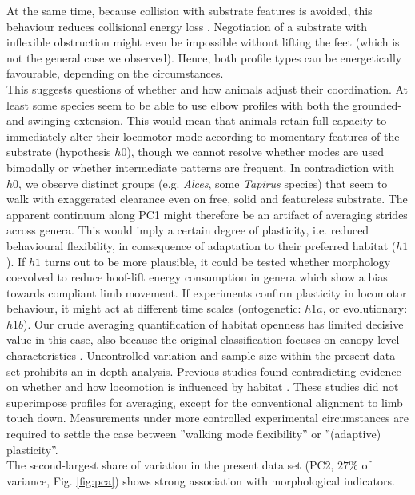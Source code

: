At the same time, because collision with substrate features is avoided, this behaviour reduces collisional energy loss \cite[i.e. loss from collision with superficial vegetation or rubble, which has to be distinguished from the collisional models in][]{Ruina2005}.
Negotiation of a substrate with inflexible obstruction might even be impossible without lifting the feet (which is not the general case we observed).
Hence, both profile types can be energetically favourable, depending on the circumstances.
\\This suggests questions of whether and how animals adjust their coordination.
At least some species seem to be able to use elbow profiles with both the grounded- and swinging extension.
This would mean that animals retain full capacity to immediately alter their locomotor mode according to momentary features of the substrate (hypothesis $h0$), though we cannot resolve whether modes are used bimodally or whether intermediate patterns are frequent.
In contradiction with $h0$, we observe distinct groups (e.g. \textit{Alces}, some \textit{Tapirus} species) that seem to walk with exaggerated clearance even on free, solid and featureless substrate.
The apparent continuum along PC1 might therefore be an artifact of averaging strides across genera.
This would imply a certain degree of plasticity, i.e. reduced behavioural flexibility, in consequence of adaptation to their preferred habitat ($h1$).
If $h1$ turns out to be more plausible, it could be tested whether morphology coevolved to reduce hoof-lift energy consumption in genera which show a bias towards compliant limb movement.
If experiments confirm plasticity in locomotor behaviour, it might act at different time scales (ontogenetic: $h1a$, or evolutionary: $h1b$).
Our crude averaging quantification of habitat openness has limited decisive value in this case, also because the original classification focuses on canopy level characteristics \citep{Stankowich2009}.
Uncontrolled variation and sample size within the present data set prohibits an in-depth analysis.
Previous studies found contradicting evidence on whether and how locomotion is influenced by habitat \cite[][]{Stoessel2012,Fuller2011,Arnold1983,Schulte2004,Druelle2019}.
These studies did not superimpose profiles for averaging, except for the conventional alignment to limb touch down.
Measurements under more controlled experimental circumstances are required to settle the case between ''walking mode flexibility'' or ''(adaptive) plasticity''.
\smallskip\\The second-largest share of variation in the present data set (PC2, $27\%$ of variance, Fig. \ref{fig:pca}) shows strong association with morphological indicators.
